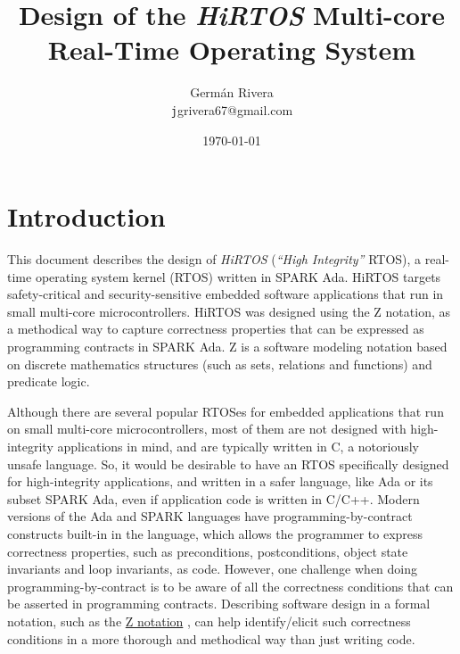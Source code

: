\documentclass[11pt,letterpaper,twoside,openany]{book}
\begin{document}
\title{Design of the \emph{HiRTOS} Multi-core \\
       Real-Time Operating System}
\author{Germ\'an Rivera \\
        \texttt jgrivera67@gmail.com}
\date{\today}
\maketitle

\frontmatter
\tableofcontents

\mainmatter
\raggedbottom
\pagestyle{myheadings}

\chapter{Introduction}

This document describes the design of \emph{HiRTOS} (\emph{``High Integrity''} RTOS),
a real-time operating system kernel (RTOS) written in SPARK Ada. HiRTOS targets
safety-critical and security-sensitive embedded software applications that run
in small multi-core microcontrollers. HiRTOS was designed using the Z notation,
as a methodical way to capture correctness properties that can be expressed
as programming contracts in SPARK Ada. Z is a software modeling notation based
on discrete mathematics structures (such as sets, relations and functions)
and predicate logic.

Although there are several popular RTOSes for embedded applications that run on small
multi-core microcontrollers, most of them are not designed with high-integrity applications
in mind, and are typically written in C, a notoriously unsafe language. So, it would be desirable
to have an RTOS specifically designed for high-integrity applications, and written in a safer
language, like Ada or its subset SPARK Ada, even if application code is written in C/C++.
Modern versions of the Ada and SPARK languages have programming-by-contract constructs built-in
in the language, which allows the programmer to express correctness properties, such as
preconditions, postconditions, object state invariants and loop invariants, as code.
However, one challenge when doing programming-by-contract is to be aware of all the correctness
conditions that can be asserted in programming contracts. Describing software design in a formal
notation, such as the \href{http://en.wikipedia.org/wiki/Z_notation}{Z notation} \cite{Zref, Zrm, WayofZ},
can help identify/elicit such correctness conditions in a more thorough and methodical way than just
writing code.
\end{document}
